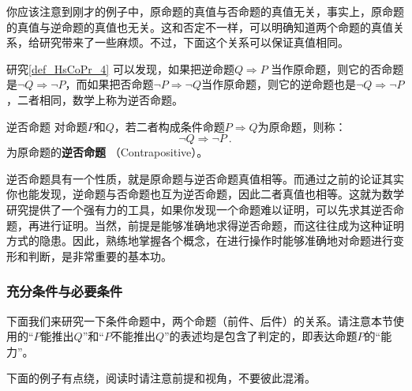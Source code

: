你应该注意到刚才的例子中，原命题的真值与否命题的真值无关，事实上，原命题的真值与逆命题的真值也无关。这和否定不一样，可以明确知道两个命题的真值关系，给研究带来了一些麻烦。不过，下面这个关系可以保证真值相同。

研究\autoref{def_HsCoPr_4} 可以发现，如果把逆命题$Q \Rightarrow P$ 当作原命题，则它的否命题是$\neg Q \Rightarrow \neg P $，而如果把否命题$\neg P \Rightarrow \neg Q $当作原命题，则它的逆命题也是$\neg Q \Rightarrow \neg P $，二者相同，数学上称为逆否命题。

\begin{definition}{逆否命题}
对命题$P$和$Q$，若二者构成条件命题$P \Rightarrow Q$为原命题，则称：
\begin{equation}
\neg Q \Rightarrow \neg P~.
\end{equation}
为原命题的\textbf{逆否命题} （Contrapositive）。
\end{definition}

逆否命题具有一个性质，就是原命题与逆否命题真值相等。而通过之前的论证其实你也能发现，逆命题与否命题也互为逆否命题，因此二者真值也相等。这就为数学研究提供了一个强有力的工具，如果你发现一个命题难以证明，可以先求其逆否命题，再进行证明。当然，前提是能够准确地求得逆否命题，而这往往成为这种证明方式的隐患。因此，熟练地掌握各个概念，在进行操作时能够准确地对命题进行变形和判断，是非常重要的基本功。

\subsubsection{充分条件与必要条件}

下面我们来研究一下条件命题中，两个命题（前件、后件）的关系。请注意本节使用的“$P$能推出$Q$”和“$P$不能推出$Q$”的表述均是包含了判定的，即表达命题$P$的“能力”。

下面的例子有点绕，阅读时请注意前提和视角，不要彼此混淆。

